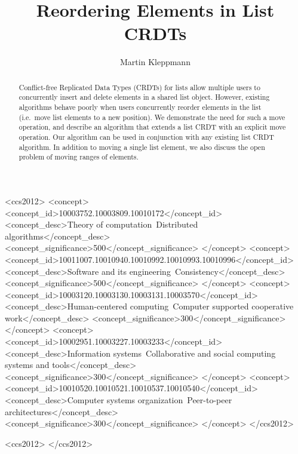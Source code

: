 \documentclass[sigplan,10pt]{acmart}
\begin{document}
\title{Reordering Elements in List CRDTs}

\author{Martin Kleppmann}

\begin{abstract}
Conflict-free Replicated Data Types (CRDTs) for lists allow multiple users to concurrently insert and delete elements in a shared list object.
However, existing algorithms behave poorly when users concurrently reorder elements in the list (i.e.\ move list elements to a new position).
We demonstrate the need for such a move operation, and describe an algorithm that extends a list CRDT with an explicit move operation.
Our algorithm can be used in conjunction with any existing list CRDT algorithm.
In addition to moving a single list element, we also discuss the open problem of moving ranges of elements.
\end{abstract}

\begin{CCSXML}
<ccs2012>
    <concept>
        <concept_id>10003752.10003809.10010172</concept_id>
        <concept_desc>Theory of computation~Distributed algorithms</concept_desc>
        <concept_significance>500</concept_significance>
    </concept>
    <concept>
        <concept_id>10011007.10010940.10010992.10010993.10010996</concept_id>
        <concept_desc>Software and its engineering~Consistency</concept_desc>
        <concept_significance>500</concept_significance>
    </concept>
    <concept>
        <concept_id>10003120.10003130.10003131.10003570</concept_id>
        <concept_desc>Human-centered computing~Computer supported cooperative work</concept_desc>
        <concept_significance>300</concept_significance>
    </concept>
    <concept>
        <concept_id>10002951.10003227.10003233</concept_id>
        <concept_desc>Information systems~Collaborative and social computing systems and tools</concept_desc>
        <concept_significance>300</concept_significance>
    </concept>
    <concept>
        <concept_id>10010520.10010521.10010537.10010540</concept_id>
        <concept_desc>Computer systems organization~Peer-to-peer architectures</concept_desc>
        <concept_significance>300</concept_significance>
    </concept>
</ccs2012>
\end{CCSXML}

\begin{CCSXML}
<ccs2012>
 </ccs2012>
\end{CCSXML}
\end{document}
